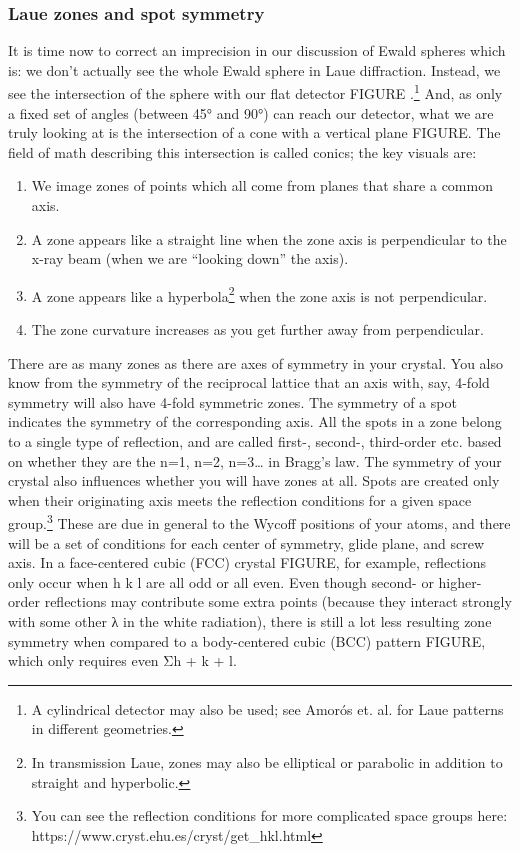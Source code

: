 \subsubsection{Laue zones and spot symmetry}
It is time now to correct an imprecision in our discussion of Ewald spheres which is: we don’t actually see the whole Ewald sphere in Laue diffraction. Instead, we see the intersection of the sphere with our flat detector FIGURE .\footnote{A cylindrical detector may also be used; see Amorós et. al. for Laue patterns in different geometries.} And, as only a fixed set of angles (between 45° and 90°) can reach our detector, what we are truly looking at is the intersection of a cone with a vertical plane FIGURE. The field of math describing this intersection is called conics; the key visuals are:
\begin{enumerate}
    \item We image zones of points which all come from planes that share a common axis.
    \item A zone appears like a straight line when the zone axis is perpendicular to the x-ray beam (when we are “looking down” the axis).
    \item A zone appears like a hyperbola\footnote{In transmission Laue, zones may also be elliptical or parabolic in addition to straight and hyperbolic.} when the zone axis is not perpendicular.
    \item The zone curvature increases as you get further away from perpendicular.
\end{enumerate}
There are as many zones as there are axes of symmetry in your crystal. You also know from the symmetry of the reciprocal lattice that an axis with, say, 4-fold symmetry will also have 4-fold symmetric zones. The symmetry of a spot indicates the symmetry of the corresponding axis. All the spots in a zone belong to a single type of reflection, and are called first-, second-, third-order etc. based on whether they are the n=1, n=2, n=3… in Bragg’s law.
The symmetry of your crystal also influences whether you will have zones at all. Spots are created only when their originating axis meets the reflection conditions for a given space group.\footnote{You can see the reflection conditions for more complicated space groups here: https://www.cryst.ehu.es/cryst/get_hkl.html } These are due in general to the Wycoff positions of your atoms, and there will be a set of conditions for each center of symmetry, glide plane, and screw axis. In a face-centered cubic (FCC) crystal FIGURE, for example, reflections only occur when h k l are all odd or all even. Even though second- or higher-order reflections may contribute some extra points (because they interact strongly with some other λ in the white radiation), there is still a lot less resulting zone symmetry when compared to a body-centered cubic (BCC) pattern FIGURE, which only requires even Σh + k + l.
